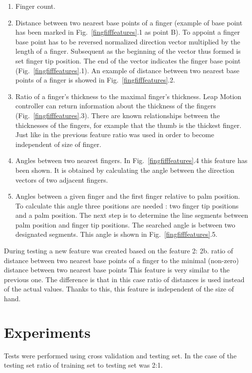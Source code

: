 \begin{enumerate}
\item Finger count. 
\item Distance between two nearest base points of a finger (example of base point has been marked in Fig.~\ref{fingfifffeatures}.1 as point B).
To appoint a finger base point has to be reversed normalized direction vector multiplied by the length of a finger. Subsequent as the beginning of the vector thus formed is set finger tip position. The end of the vector indicates the finger base point (Fig.~\ref{fingfifffeatures}.1). An example of distance between two nearest base points of a finger is showed in Fig.~\ref{fingfifffeatures}.2.
\item Ratio of a finger's thickness to the maximal finger's thickness. 
Leap Motion controller can return information about the thickness of the fingers (Fig.~\ref{fingfifffeatures}.3). There are known relationships between the thicknesses of the fingers, for example that the thumb is the thickest finger. Just like in the previous feature ratio was used in order to become independent of size of finger.
\item Angles between two nearest fingers.
In Fig.~\ref{fingfifffeatures}.4  this feature has been shown. It is obtained by calculating the angle between the direction vectors of two adjacent fingers.
\item Angles between a given finger and the first finger relative to palm position. 
To calculate this angle three positions are needed : two finger tip positions and a palm position. The next step is to determine the line segments between palm position and finger tip positions. The searched angle is between two designated segments. This angle is shown in Fig.~\ref{fingfifffeatures}.5.
\end{enumerate}

During testing a new feature was created based on the feature 2:\newline
2b. ratio of distance between two nearest base points of a finger to the minimal (non-zero) distance between two nearest base points
This feature is very similar to the previous one. The difference is that in this case ratio of distances is used instead of the actual values. Thanks to this, this feature is independent of the size of hand.

\section{Experiments}
Tests were performed using cross validation and testing set. In the case of the testing set ratio of training set to testing set was 2:1.

